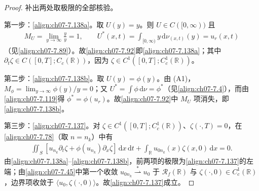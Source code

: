 \documentclass[../../main.tex]{subfiles}%
\begin{document}
\begin{proof}
补出两处取极限的全部核验。

第一步：\eqref{align:ch07-7.138a}。取 $U(y)=y$。则 $U\in C([0,\infty))$ 且
\begin{align*}
M_U=\lim_{y\to\infty}\frac{y}{y}=1,\qquad
U^*(x,t)=\int_{[0,\infty)}y\,\mathrm{d}\nu_{(x,t)}(y)=u_r(x,t)
\end{align*}
（见\eqref{align:ch07-7.89}）。故\eqref{align:ch07-7.92}即\eqref{align:ch07-7.138a}；其中 $\partial_t\zeta\in C([0,T];C_c(\mathbb{R}))$，因为 $\zeta\in C^1([0,T];C^1_c(\mathbb{R}))$。

第二步：\eqref{align:ch07-7.138b}。取 $U(y)=\phi(y)$。由 (A1)，$M_\phi=\lim_{y\to\infty}\phi(y)/y=0$；又 $U^*=\int\phi\,\mathrm{d}\nu=\phi^*$（见\eqref{align:ch07-7.4}），而由\eqref{align:ch07-7.119}得 $\phi^*=\phi(u_r)$。故\eqref{align:ch07-7.92}中 $M_U$ 项消失，即\eqref{align:ch07-7.138b}。

第三步：\eqref{align:ch07-7.137}。对 $\zeta\in C^1([0,T];C^1_c(\mathbb{R}))$、$\zeta(\cdot,T)=0$，在\eqref{align:ch07-7.78}（取 $n=n_k$）中有
\begin{align*}
\iint_S[u_{n_k}\partial_t\zeta+\phi(u_{n_k})\partial_x\zeta]\,\mathrm{d}x\,\mathrm{d}t+\int_{\mathbb{R}}u_{0n_k}(x)\zeta(x,0)\,\mathrm{d}x=0.
\end{align*}
由\eqref{align:ch07-7.138a}--\eqref{align:ch07-7.138b}，前两项的极限为\eqref{align:ch07-7.137}的左端；由\eqref{align:ch07-7.45}中第一个收敛 $u_{0n_k}\stackrel{*}{\rightharpoonup}u_0$ 于 $\mathscr{R}_f(\mathbb{R})$ 与 $\zeta(\cdot,0)\in C^1_c(\mathbb{R})$，边界项收敛于 $\langle u_0,\zeta(\cdot,0)\rangle$。故\eqref{align:ch07-7.137}成立。


\end{proof}
\end{document}
